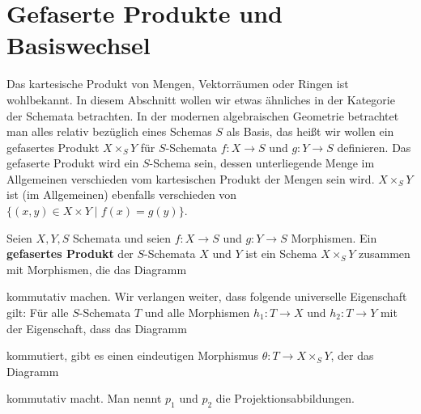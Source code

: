 

\chapter{Gefaserte Produkte und Basiswechsel}
\label{chap:8}
Das kartesische Produkt von Mengen, Vektorräumen oder Ringen ist wohlbekannt. In diesem Abschnitt wollen wir etwas ähnliches in der Kategorie der Schemata betrachten. In der modernen algebraischen Geometrie betrachtet man alles relativ bezüglich eines Schemas $S$ als Basis, das heißt wir wollen ein gefasertes Produkt $X \times_S Y$ für $S$-Schemata $f\colon X \to S$ und $g \colon Y \to S$ definieren. Das gefaserte Produkt wird ein $S$-Schema sein, dessen unterliegende Menge im Allgemeinen verschieden vom kartesischen Produkt der Mengen sein wird. $X \times_S Y$ ist (im Allgemeinen) ebenfalls verschieden von $\{(x,y) \in X \times Y\mid f(x) = g(y)\}$.

\begin{defn}
\label{defn:8.1}
	Seien $X,Y,S$ Schemata und seien $f\colon X \to S$ und $g \colon Y \to S$ Morphismen. Ein \textbf{gefasertes Produkt} der $S$-Schemata $X$ und $Y$ ist ein Schema $X\times_S Y$ zusammen mit Morphismen, die das Diagramm
	\begin{center}
	\end{center}
	kommutativ machen. Wir verlangen weiter, dass folgende universelle Eigenschaft gilt: Für alle $S$-Schemata $T$ und alle Morphismen $h_1\colon T \to X$ und $h_2\colon T \to Y$ mit der Eigenschaft, dass das Diagramm
	\begin{center}
	\end{center}
	kommutiert, gibt es einen eindeutigen Morphismus $\theta\colon T \to X \times_S Y$, der das Diagramm
	\begin{center}
	\end{center}
	kommutativ macht. Man nennt $p_1$ und $p_2$ die Projektionsabbildungen.
\end{defn}

